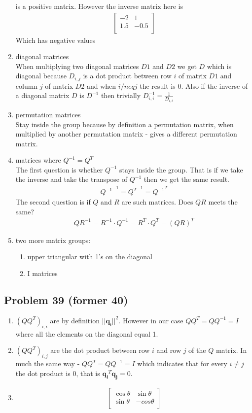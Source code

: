 \documentclass[a4paper,11pt]{article}
\newcommand{\mybf}[1]{\boldsymbol{#1}}
\newcommand{\norm}[1]{\lvert\lvert #1 \rvert\rvert}
\begin{document}
\begin{enumerate}
is a positive matrix. However the inverse matrix here is
\begin{align}
\begin{bmatrix}
-2 & 1\\
1.5 & -0.5\\
\end{bmatrix}
\end{align}
Which has negative values
\item diagonal matrices\\
When multiplying two diagonal matrices $D1$ and $D2$ we get $D$ which is diagonal because $D_{i,j}$ is a dot product between row $i$ of matrix $D1$ and column $j$ of matrix $D2$ and when $i /neq j$ the result is 0.
Also if the inverse of a diagonal matrix $D$ is $D^{-1}$ then trivially $D^{-1}_{i,i} = \frac{1}{D_{i,i}}$ 
\item permutation matrices\\
Stay inside the group because by definition a permutation matrix, when multiplied by another permutation matrix - gives a different permutation matrix. 
\item matrices where $Q^{-1}=Q^T$\\
The first question is whether $Q^{-1}$ stays inside the group. That is if we take the inverse and take the transpose of $Q^{-1}$ then we get the same result.
\begin{align}
{Q^{-1}}^{-1} = {Q^T}^{-1} = {Q^{-1}}^T
\end{align}
The second question is if $Q$ and $R$ are such matrices. Does $QR$ meets the same?
\begin{align}
{QR}^{-1} = R^{-1} \cdot Q^{-1}=R^T \cdot Q^T = (QR)^T
\end{align}
\item two more matrix groups:
\begin{enumerate}
\item upper triangular with 1's on the diagonal
\item I matrices
\end{enumerate}
\end{enumerate}
\subsection*{Problem 39 (former 40)}
\begin{enumerate}[label=\alph*]
\item $(QQ^T)_{i,i}$ are by definition $\norm{\mybf{q_i}}^2$. However in our case $QQ^T = QQ^{-1} = I$ where all the elements on the diagonal equal 1.
\item $(QQ^T)_{i,j}$ are the dot product between row $i$ and row $j$ of the $Q$ matrix. In much the same way - $QQ^T = QQ^{-1} = I$ which indicates that for every $i \neq j$ the dot product is 0, that is $\mybf{q_i}^T\mybf{q_j}=0$.
\item
\begin{align}
\begin{bmatrix}
\cos \theta & \sin \theta\\
\sin \theta & -cos \theta\\
\end{bmatrix}
\end{align}
\end{enumerate}
\end{document}
